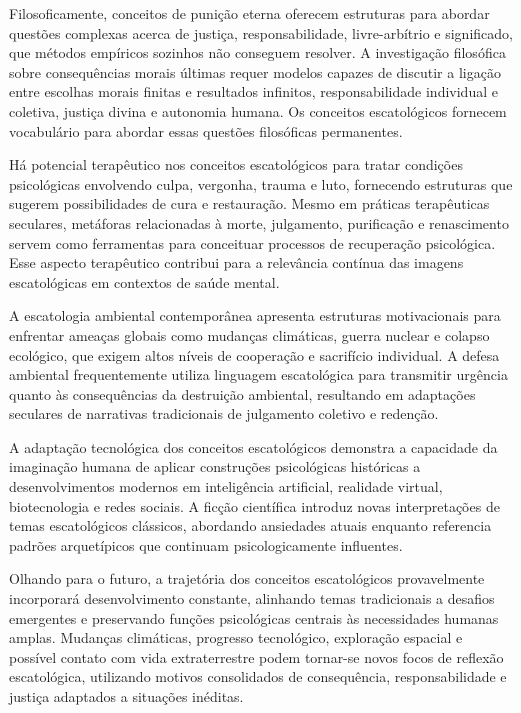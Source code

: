 Filosoficamente, conceitos de punição eterna oferecem estruturas para abordar questões complexas acerca de justiça, responsabilidade, livre-arbítrio e significado, que métodos empíricos sozinhos não conseguem resolver. A investigação filosófica sobre consequências morais últimas requer modelos capazes de discutir a ligação entre escolhas morais finitas e resultados infinitos, responsabilidade individual e coletiva, justiça divina e autonomia humana. Os conceitos escatológicos fornecem vocabulário para abordar essas questões filosóficas permanentes.

Há potencial terapêutico nos conceitos escatológicos para tratar condições psicológicas envolvendo culpa, vergonha, trauma e luto, fornecendo estruturas que sugerem possibilidades de cura e restauração. Mesmo em práticas terapêuticas seculares, metáforas relacionadas à morte, julgamento, purificação e renascimento servem como ferramentas para conceituar processos de recuperação psicológica. Esse aspecto terapêutico contribui para a relevância contínua das imagens escatológicas em contextos de saúde mental.

A escatologia ambiental contemporânea apresenta estruturas motivacionais para enfrentar ameaças globais como mudanças climáticas, guerra nuclear e colapso ecológico, que exigem altos níveis de cooperação e sacrifício individual. A defesa ambiental frequentemente utiliza linguagem escatológica para transmitir urgência quanto às consequências da destruição ambiental, resultando em adaptações seculares de narrativas tradicionais de julgamento coletivo e redenção.

A adaptação tecnológica dos conceitos escatológicos demonstra a capacidade da imaginação humana de aplicar construções psicológicas históricas a desenvolvimentos modernos em inteligência artificial, realidade virtual, biotecnologia e redes sociais. A ficção científica introduz novas interpretações de temas escatológicos clássicos, abordando ansiedades atuais enquanto referencia padrões arquetípicos que continuam psicologicamente influentes.

Olhando para o futuro, a trajetória dos conceitos escatológicos provavelmente incorporará desenvolvimento constante, alinhando temas tradicionais a desafios emergentes e preservando funções psicológicas centrais às necessidades humanas amplas. Mudanças climáticas, progresso tecnológico, exploração espacial e possível contato com vida extraterrestre podem tornar-se novos focos de reflexão escatológica, utilizando motivos consolidados de consequência, responsabilidade e justiça adaptados a situações inéditas.

